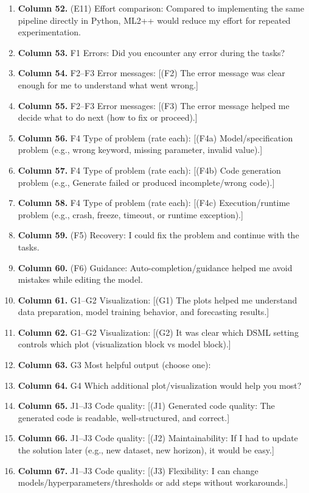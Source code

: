 \begin{enumerate}[leftmargin=*]
    \item \textbf{Column 52.} (E11) Effort comparison: Compared to implementing the same pipeline directly in Python, ML2++ would reduce my effort for repeated experimentation.
    \item \textbf{Column 53.} F1 Errors: Did you encounter any error during the tasks?
    \item \textbf{Column 54.} F2--F3 Error messages: [(F2) The error message was clear enough for me to understand what went wrong.]
    \item \textbf{Column 55.} F2--F3 Error messages: [(F3) The error message helped me decide what to do next (how to fix or proceed).]
    \item \textbf{Column 56.} F4 Type of problem (rate each): [(F4a) Model/specification problem (e.g., wrong keyword, missing parameter, invalid value).]
    \item \textbf{Column 57.} F4 Type of problem (rate each): [(F4b) Code generation problem (e.g., Generate failed or produced incomplete/wrong code).]
    \item \textbf{Column 58.} F4 Type of problem (rate each): [(F4c) Execution/runtime problem (e.g., crash, freeze, timeout, or runtime exception).]
    \item \textbf{Column 59.} (F5) Recovery: I could fix the problem and continue with the tasks.
    \item \textbf{Column 60.} (F6) Guidance: Auto-completion/guidance helped me avoid mistakes while editing the model.
    \item \textbf{Column 61.} G1--G2 Visualization: [(G1) The plots helped me understand data preparation, model training behavior, and forecasting results.]
    \item \textbf{Column 62.} G1--G2 Visualization: [(G2) It was clear which DSML setting controls which plot (visualization block vs model block).]
    \item \textbf{Column 63.} G3 Most helpful output (choose one):
    \item \textbf{Column 64.} G4 Which additional plot/visualization would help you most?
    \item \textbf{Column 65.} J1--J3 Code quality: [(J1) Generated code quality: The generated code is readable, well-structured, and correct.]
    \item \textbf{Column 66.} J1--J3 Code quality: [(J2) Maintainability: If I had to update the solution later (e.g., new dataset, new horizon), it would be easy.]
    \item \textbf{Column 67.} J1--J3 Code quality: [(J3) Flexibility: I can change models/hyperparameters/thresholds or add steps without workarounds.]

\end{enumerate}
